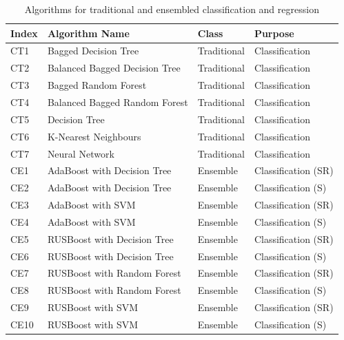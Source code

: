 \documentclass[10pt,journal,compsoc]{IEEEtran}
\begin{document}
\begin{table}[!t]
\scriptsize
\caption{Algorithms for traditional and ensembled classification and regression}
\label{table:algos}
\centering
{
\begin{tabular}{| l | l | l | l | }
\hline
\textbf{Index} & \textbf{Algorithm Name} & \textbf{Class} & \textbf{Purpose} \\
\hline
CT1 & Bagged Decision Tree & Traditional & Classification \\
\hline
CT2 & Balanced Bagged Decision Tree & Traditional &  Classification \\
\hline
CT3 & Bagged Random Forest & Traditional &  Classification \\
\hline
CT4 & Balanced Bagged Random Forest & Traditional & Classification \\
\hline
CT5 & Decision Tree & Traditional & Classification \\
\hline
CT6 & K-Nearest Neighbours & Traditional & Classification \\
\hline
CT7 & Neural Network & Traditional & Classification \\
\hline
CE1 & AdaBoost with Decision Tree & Ensemble & Classification (SR)\\
\hline
CE2 & AdaBoost with Decision Tree & Ensemble & Classification (S)\\
\hline
CE3 & AdaBoost with SVM & Ensemble & Classification (SR)\\
\hline
CE4 & AdaBoost with SVM & Ensemble & Classification (S)\\
\hline
CE5 & RUSBoost with Decision Tree & Ensemble & Classification (SR)\\
\hline
CE6 & RUSBoost with Decision Tree & Ensemble & Classification (S)\\
\hline
CE7 & RUSBoost with Random Forest & Ensemble & Classification (SR)\\
\hline
CE8 & RUSBoost with Random Forest & Ensemble & Classification (S)\\
\hline
CE9 & RUSBoost with SVM & Ensemble & Classification (SR)\\
\hline
CE10 & RUSBoost with SVM & Ensemble & Classification (S)\\
\hline
\end{tabular}
}
\end{table}
\end{document}
